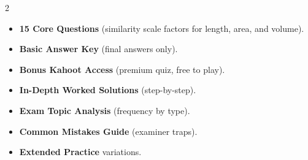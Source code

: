 \documentclass[11pt,a4paper]{article}
\newcommand{\FullReleaseDate}{April 30, 2026}
\begin{document}
\vspace{8pt}

\begin{multicols}{2}
  \begin{tcolorbox}[card, title=\sffamily\bfseries\textcolor{white}{\faHandPointDown\ TODAY (Simplified Version)}, colbacktitle=mainblue, boxed title style={sharp corners, boxrule=0pt}]
    \begin{itemize}[leftmargin=1.2em, itemsep=2pt]
      \item \small \textbf{15 Core Questions} (similarity scale factors for length, area, and volume).
      \item \small \textbf{Basic Answer Key} (final answers only).
      \item \small \textbf{Bonus Kahoot Access} (premium quiz, free to play).
    \end{itemize}
  \end{tcolorbox}

  \columnbreak

  \begin{tcolorbox}[card, title=\sffamily\bfseries\textcolor{white}{\faRocket\ ON \FullReleaseDate\ (Full Upgrade)}, colbacktitle=mainblue, boxed title style={sharp corners, boxrule=0pt}]
    \begin{itemize}[leftmargin=1.2em, itemsep=2pt]
      \item \small \textbf{In-Depth Worked Solutions} (step-by-step).
      \item \small \textbf{Exam Topic Analysis} (frequency by type).
      \item \small \textbf{Common Mistakes Guide} (examiner traps).
      \item \small \textbf{Extended Practice} variations.
    \end{itemize}
  \end{tcolorbox}
\end{multicols}
\end{document}
